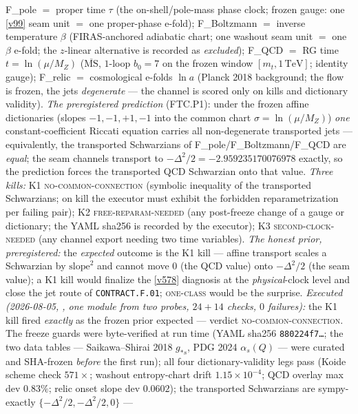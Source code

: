 F\_pole $=$ proper time $\tau$ (the on-shell/pole-mass phase clock;
frozen gauge: one \vref{v99} seam unit $=$ one proper-phase e-fold);
F\_Boltzmann $=$ inverse temperature $\beta$ (FIRAS-anchored
adiabatic chart; one washout seam unit $=$ one $\beta$ e-fold; the
$z$-linear alternative is recorded as \emph{excluded});
F\_QCD $=$ RG time $t=\ln(\mu/M_Z)$ ($\overline{\mathrm{MS}}$,
$1$-loop $b_0=7$ on the
frozen window $[m_t,1\,\mathrm{TeV}]$; identity gauge);
F\_relic $=$ cosmological e-folds $\ln a$ (Planck 2018 background;
the flow is frozen, the jets \emph{degenerate} --- the channel is
scored only on kills and dictionary validity).  \emph{The
preregistered prediction} (FTC.P1): under the frozen affine
dictionaries (slopes $-1,-1,+1,-1$ into the common chart
$\sigma=\ln(\mu/M_Z)$) \emph{one} constant-coefficient Riccati
equation carries all non-degenerate transported jets ---
equivalently, the transported Schwarzians of
F\_pole/F\_Boltzmann/F\_QCD are \emph{equal}; the seam channels
transport to $-\Delta^2/2=-2.959235170076978$ exactly, so the
prediction forces the transported QCD Schwarzian onto that value.
\emph{Three kills:} K1 \textsc{no-common-connection} (symbolic
inequality of the transported Schwarzians; on kill the executor must
exhibit the forbidden reparametrization per failing pair); K2
\textsc{free-reparam-needed} (any post-freeze change of a gauge or
dictionary; the YAML sha256 is recorded by the executor); K3
\textsc{second-clock-needed} (any channel export needing two time
variables).  \emph{The honest prior, preregistered:} the
\emph{expected} outcome is the K1 kill --- affine transport scales a
Schwarzian by $\mathrm{slope}^2$ and cannot move $0$ (the QCD value)
onto $-\Delta^2/2$ (the seam value); a K1 kill would finalize the
\vref{v578} diagnosis at the \emph{physical}-clock level and close
the jet route of \texttt{CONTRACT.F.01}; \textsc{one-class} would be
the surprise.  \emph{Executed (2026-08-05,
, one module from two probes,
$24+14$ checks, $0$ failures):} the K1 kill fired \emph{exactly} as
the frozen prior expected --- verdict \textsc{no-common-connection}.
The freeze guards were byte-verified at run time (YAML sha256
\texttt{880224f7\ldots}; the two data tables --- Saikawa--Shirai
2018 $g_{*s}$, PDG 2024 $\alpha_s(Q)$ --- were curated and
SHA-frozen \emph{before} the first run); all four
dictionary-validity legs pass (Koide scheme check $571\times$;
washout entropy-chart drift $1.15\times10^{-4}$; QCD overlay max
dev $0.83\%$; relic onset slope dev $0.0602$); the transported
Schwarzians are sympy-exactly $\{-\Delta^2/2,-\Delta^2/2,0\}$ ---
